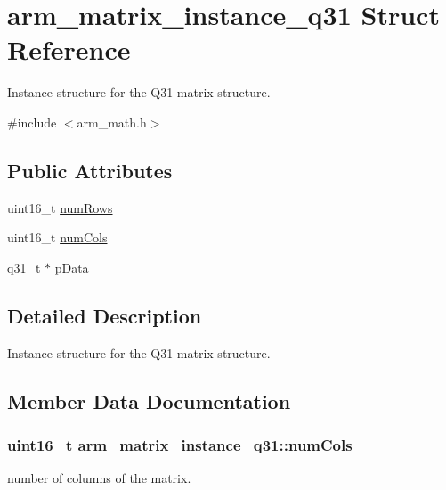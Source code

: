 \hypertarget{structarm__matrix__instance__q31}{}\section{arm\+\_\+matrix\+\_\+instance\+\_\+q31 Struct Reference}
\label{structarm__matrix__instance__q31}


Instance structure for the Q31 matrix structure.  




{\ttfamily \#include $<$arm\+\_\+math.\+h$>$}

\subsection*{Public Attributes}
\begin{DoxyCompactItemize}
\item 
uint16\+\_\+t \hyperlink{structarm__matrix__instance__q31_a63bacac158a821c8cfc06088d251598c}{num\+Rows}
\item 
uint16\+\_\+t \hyperlink{structarm__matrix__instance__q31_abd161da7614eda927157f18b698074b1}{num\+Cols}
\item 
q31\+\_\+t $\ast$ \hyperlink{structarm__matrix__instance__q31_a09a64267c0579fef086efc9059741e56}{p\+Data}
\end{DoxyCompactItemize}


\subsection{Detailed Description}
Instance structure for the Q31 matrix structure. 

\subsection{Member Data Documentation}
\subsubsection[{\texorpdfstring{num\+Cols}{numCols}}]{\setlength{\rightskip}{0pt plus 5cm}uint16\+\_\+t arm\+\_\+matrix\+\_\+instance\+\_\+q31\+::num\+Cols}\hypertarget{structarm__matrix__instance__q31_abd161da7614eda927157f18b698074b1}{}\label{structarm__matrix__instance__q31_abd161da7614eda927157f18b698074b1}
number of columns of the matrix. 
